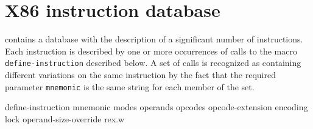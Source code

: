 \chapter{X86 instruction database}

\sysname{} contains a database with the description of a significant
number of instructions.  Each instruction is described by one or more
occurrences of calls to the macro \texttt{define-instruction}
described below.  A set of calls is recognized as containing different
variations on the same instruction by the fact that the required
parameter \texttt{mnemonic} is the same string for each member of the
set.

 define-instruction {mnemonic \key 
				       modes
				       operands
				       opcodes
				       opcode-extension
				       encoding
				       lock
				       operand-size-override
				       rex.w}
